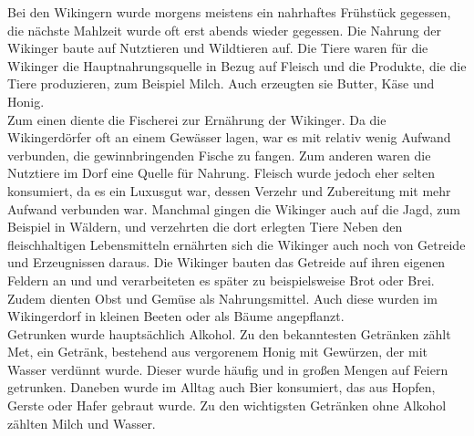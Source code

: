 \documentclass[12pt,a4paper,ngerman,openany]{book}
\begin{document}
Bei den Wikingern wurde morgens meistens ein nahrhaftes Frühstück gegessen, die nächste Mahlzeit wurde oft erst abends wieder gegessen. Die Nahrung der Wikinger baute auf Nutztieren und Wildtieren auf. Die Tiere waren für die Wikinger die Hauptnahrungsquelle in Bezug auf Fleisch und die Produkte, die die Tiere produzieren, zum Beispiel Milch. Auch erzeugten sie Butter, Käse und Honig. \\
Zum einen diente die Fischerei zur Ernährung der Wikinger. Da die Wikingerdörfer oft an einem Gewässer lagen, war es mit relativ wenig Aufwand verbunden, die gewinnbringenden Fische zu fangen. Zum anderen waren die Nutztiere im Dorf eine Quelle für Nahrung. Fleisch wurde jedoch eher selten konsumiert, da es ein Luxusgut war, dessen Verzehr und Zubereitung mit mehr Aufwand verbunden war. Manchmal gingen die Wikinger auch auf die Jagd, zum Beispiel in Wäldern, und verzehrten die dort erlegten Tiere
Neben den fleischhaltigen Lebensmitteln ernährten sich die Wikinger auch noch von Getreide und Erzeugnissen daraus. Die Wikinger bauten das Getreide auf ihren eigenen Feldern an und und verarbeiteten es später zu beispielsweise Brot oder Brei. Zudem dienten Obst und Gemüse als Nahrungsmittel. Auch diese wurden im Wikingerdorf in kleinen Beeten oder als Bäume angepflanzt.\\
Getrunken wurde hauptsächlich Alkohol. Zu den bekanntesten Getränken zählt Met, ein Getränk, bestehend aus vergorenem Honig mit Gewürzen, der mit Wasser verdünnt wurde. Dieser wurde häufig und in großen Mengen auf Feiern getrunken. Daneben wurde im Alltag auch Bier konsumiert, das aus Hopfen, Gerste oder Hafer gebraut wurde. Zu den wichtigsten Getränken ohne Alkohol zählten Milch und Wasser.
\end{document}
